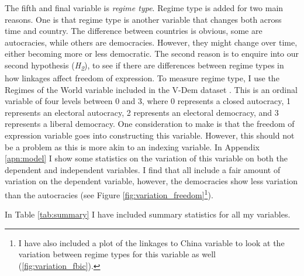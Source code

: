The fifth and final variable is \textit{regime type}. Regime type is added for two main reasons. One is that regime type is another variable that changes both across time and country. The difference between countries is obvious, some are autocracies, while others are democracies. However, they might change over time, either becoming more or less democratic. The second reason is to enquire into our second hypothesis (\textit{H\textsubscript{2}}), to see if there are differences between regime types in how linkages affect freedom of expression. To measure regime type, I use the Regimes of the World variable included in the V-Dem dataset \citep{coppedge_v-dem_2025}. This is an ordinal variable of four levels between 0 and 3, where 0 represents a closed autocracy, 1 represents an electoral autocracy, 2 represents an electoral democracy, and 3 represents a liberal democracy. One consideration to make is that the freedom of expression variable goes into constructing this variable. However, this should not be a problem as this is more akin to an indexing variable. In Appendix \ref{apn:model} I show some statistics on the variation of this variable on both the dependent and independent variables. I find that all include a fair amount of variation on the dependent variable, however, the democracies show less variation than the autocracies (see Figure \ref{fig:variation_freedom}\footnote{I have also included a plot of the linkages to China variable to look at the variation between regime types for this variable as well (\ref{fig:variation_fbic}).}).

In Table \ref{tab:summary} I have included summary statistics for all my variables.

